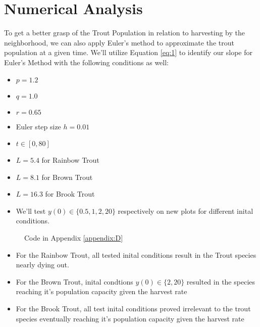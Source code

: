\documentclass[letterpaper,12pt]{article}
\begin{document}
\section{Numerical Analysis} 
To get a better grasp of the Trout Population in relation to harvesting by the neighborhood, we can also apply Euler's method to approximate the trout population at a given time. 
We'll utilize Equation \eqref{eq:1} to identify our slope for Euler's Method with the following conditions as well:
\begin{itemize}
    \item \(p = 1.2\)
    \item \(q = 1.0\)
    \item \(r = 0.65\)
    \item Euler step size \(h = 0.01\)
    \item \(t \in [0,80]\)
    \item \(L = 5.4\) for Rainbow Trout
    \item \(L = 8.1\) for Brown Trout
    \item \(L = 16.3\) for Brook Trout
    \item We'll test \(y(0) \in \{0.5,1,2,20\}\) respectively on new plots for different inital conditions.
\end{itemize}
\begin{figure}[H]
    \begin{adjustwidth}{-1in}{-1in}
    \centering
    \begin{subfigure}[b]{0.65\textwidth}
        \centering
        
        \label{fig:5a}
    \end{subfigure}
    \hfill
    \begin{subfigure}[b]{0.65\textwidth}
        \centering
        
        \label{fig:5b}
    \end{subfigure}
    \hfill
    \begin{subfigure}[b]{0.65\textwidth}
        \centering
        
        \label{fig:5c}
    \end{subfigure}
    \hfill
    \begin{subfigure}[b]{0.65\textwidth}
        \centering
        
        \label{fig:5d}
    \end{subfigure}
    \caption{Code in Appendix \ref{appendix:D}}
    \label{fig:5}
    \end{adjustwidth}
\end{figure}
\begin{itemize}
    \item For the Rainbow Trout, all tested inital conditions result in the Trout species nearly dying out.
    \item For the Brown Trout, inital condtions \(y(0) \in \{2, 20\}\) resulted in the species reaching it's population capacity given the harvest rate
    \item For the Brook Trout, all test inital conditions proved irrelevant to the trout species eventually reaching it's population capacity given the harvest rate
\end{itemize}
\end{document}
